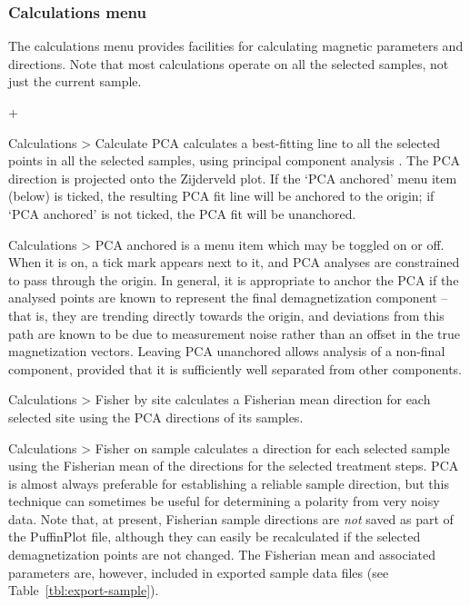 \documentclass[a4paper,british]{article}
\newcommand{\menuitemlabel}[1]{%
\mbox{\textsf{#1}}\hfil}
\newenvironment{menuitemlist}%
{\begin{list}{}{%
\renewcommand{\makelabel}{\menuitemlabel}%
\setlength{\labelwidth}{35pt}%
\setlength{\leftmargin}%
             {\labelwidth+\labelsep}}}%
{\end{list}}
\newcommand{\caps}[1]{\MakeTextUppercase{#1}} %
\newcommand{\submenu}{ \textgreater{} } %
\begin{document}
\subsubsection{\label{sec:functions-calcs}Calculations menu}

The calculations menu provides facilities for calculating magnetic
parameters and directions. Note that most calculations operate on
all the selected samples, not just the current sample.

\begin{menuitemlist}

\item[Calculations\submenu Calculate \caps{pca}] calculates a best-fitting
  line to all the selected points in all the selected samples, using
  principal component analysis \citep{kirschvink1980least}. The \caps{pca}
  direction is projected onto the Zijderveld plot. If the `\caps{pca}
  anchored' menu item (below) is ticked, the resulting \caps{pca} fit line
  will be anchored to the origin; if `\caps{pca} anchored' is not ticked, the
  \caps{pca} fit will be unanchored.

\item[Calculations\submenu \caps{pca} anchored] is a menu item which may be
  toggled on or off. When it is on, a tick mark appears next to it, and
  \caps{pca} analyses are constrained to pass through the origin. In general,
  it is appropriate to anchor the \caps{pca} if the analysed points are known
  to represent the final demagnetization component -- that is, they are
  trending directly towards the origin, and deviations from this path are
  known to be due to measurement noise rather than an offset in the true
  magnetization vectors. Leaving \caps{pca} unanchored allows analysis of a
  non-final component, provided that it is sufficiently well separated from
  other components.

\item[Calculations\submenu Fisher by site] calculates a Fisherian mean
  direction for each selected site using the \caps{pca} directions of its
  samples.

\item[Calculations\submenu Fisher on sample] calculates a direction for each
  selected sample using the Fisherian mean of the directions for the selected
  treatment steps. \caps{Pca} is almost always preferable for establishing a
  reliable sample direction, but this technique can sometimes be useful for
  determining a polarity from very noisy data. Note that, at present,
  Fisherian sample directions are {\em not} saved as part of the PuffinPlot
  file, although they can easily be recalculated if the selected
  demagnetization points are not changed. The Fisherian mean and associated
  parameters are, however, included in exported sample data files 
  (see Table~\ref{tbl:export-sample}).


\end{menuitemlist}
\end{document}
